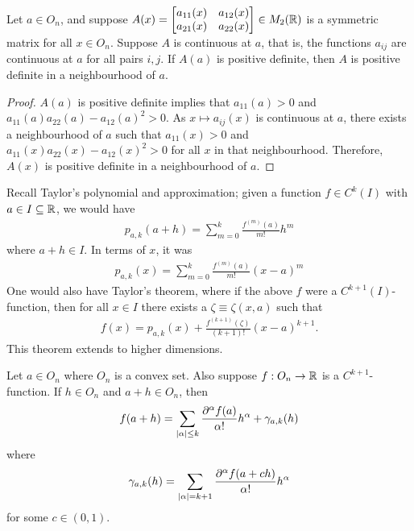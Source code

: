 \begin{lemma}
    Let $a \in O_{n}$, and suppose $A(x) = \begin{bmatrix}
        a_{11}(x) & a_{12}(x) \\ a_{21}(x) & a_{22}(x)
    \end{bmatrix} \in M_{2}(\mathbb{R})$ is a symmetric matrix for all $x \in O_{n}$. Suppose $A$ is continuous at $a$, that is, the functions $a_{ij}$ are continuous at $a$ for all pairs $i,j$. If $A(a)$ is positive definite, then $A$ is positive definite in a neighbourhood of $a$.
\end{lemma}

\begin{proof}
    $A(a)$ is positive definite implies that $a_{11}(a) > 0$ and $a_{11}(a) a_{22}(a) - a_{12}(a)^{2} > 0$. As $x \mapsto a_{ij}(x)$ is continuous at $a$, there exists a neighbourhood of $a$ such that $a_{11}(x) > 0$ and $a_{11}(x)a_{22}(x) - a_{12}(x)^{2} > 0$ for all $x$ in that neighbourhood. Therefore, $A(x)$ is positive definite in a neighbourhood of $a$.
\end{proof}

Recall Taylor's polynomial and approximation; given a function $f \in C^{k}(I)$ with $a \in I \subseteq \mathbb{R}$, we would have
\begin{align}
    p_{a,k}(a+h) = \sum_{m=0}^{k} \frac{f^{(m)}(a)}{m!}h^{m}
\end{align}
where $a+h \in I$. In terms of $x$, it was
\begin{align}
    p_{a,k}(x) = \sum_{m=0}^{k} \frac{f^{(m)}(a)}{m!}(x-a)^{m}
\end{align}
One would also have Taylor's theorem, where if the above $f$ were a $C^{k+1}(I)$-function, then for all $x \in I$ there exists a $\zeta \equiv \zeta(x,a)$ such that
\begin{align}
    f(x) = p_{a,k}(x) + \frac{f^{(k+1)}(\zeta)}{(k+1)!}(x-a)^{k+1}.
\end{align}
This theorem extends to higher dimensions.

\begin{theorem}
    Let $a \in O_{n}$ where $O_{n}$ is a convex set. Also suppose $f:O_{n} \to \mathbb{R}$ is a $C^{k+1}$-function. If $h \in O_{n}$ and $a+h \in O_{n}$, then
    \begin{align}
        f(a+h) = \sum_{\left| \alpha \right| \leq k} \frac{\partial^{\alpha}f(a)}{\alpha !} h^{\alpha} + \gamma_{a,k}(h)
    \end{align}
    where
    \begin{align}
        \gamma_{a,k}(h) = \sum_{\left| \alpha \right| = k+1} \frac{\partial^{\alpha}f(a+ch)}{\alpha !} h^{\alpha}
    \end{align}
    for some $c \in (0,1)$.
\end{theorem}

